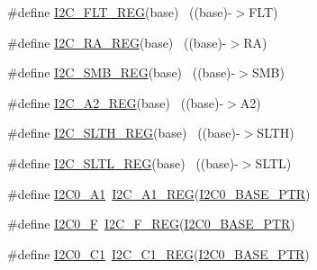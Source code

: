 \begin{DoxyCompactItemize}
\item 
\#define \hyperlink{group___i2_c___register___accessor___macros_gabb230346f2358d18e6f9f126c3ae2398}{I2\+C\+\_\+\+F\+L\+T\+\_\+\+R\+EG}(base)                                            ~((base)-\/$>$F\+LT)
\item 
\#define \hyperlink{group___i2_c___register___accessor___macros_ga9b674394721710e98ba9123d38b6fa1a}{I2\+C\+\_\+\+R\+A\+\_\+\+R\+EG}(base)                                              ~((base)-\/$>$RA)
\item 
\#define \hyperlink{group___i2_c___register___accessor___macros_ga62f6225106137462aab11955b8264f81}{I2\+C\+\_\+\+S\+M\+B\+\_\+\+R\+EG}(base)                                            ~((base)-\/$>$S\+MB)
\item 
\#define \hyperlink{group___i2_c___register___accessor___macros_ga01c9da9747989c2d30eac15661d1f5c3}{I2\+C\+\_\+\+A2\+\_\+\+R\+EG}(base)                                              ~((base)-\/$>$A2)
\item 
\#define \hyperlink{group___i2_c___register___accessor___macros_gac1a6a43a0292446673c0d1d39cd69e21}{I2\+C\+\_\+\+S\+L\+T\+H\+\_\+\+R\+EG}(base)                                          ~((base)-\/$>$S\+L\+TH)
\item 
\#define \hyperlink{group___i2_c___register___accessor___macros_gaa9eb90e621e77e8758f4c7f6724b9011}{I2\+C\+\_\+\+S\+L\+T\+L\+\_\+\+R\+EG}(base)                                          ~((base)-\/$>$S\+L\+TL)
\item 
\#define \hyperlink{group___i2_c___register___accessor___macros_gaab25b2cfc0f440c11ba84defee435e0e}{I2\+C0\+\_\+\+A1}~\hyperlink{group___i2_c___register___accessor___macros_gaf3e90bf855e545f82942bfb9207756a6}{I2\+C\+\_\+\+A1\+\_\+\+R\+EG}(\hyperlink{group___i2_c___peripheral_ga6db92fda81fa3b6a1c8c6a85e66d51a0}{I2\+C0\+\_\+\+B\+A\+S\+E\+\_\+\+P\+TR})
\item 
\#define \hyperlink{group___i2_c___register___accessor___macros_gacd455dbff54b6e42523e833319e562e4}{I2\+C0\+\_\+F}~\hyperlink{group___i2_c___register___accessor___macros_ga7aae8ba32e5e505c2db1bbc3b7c20213}{I2\+C\+\_\+\+F\+\_\+\+R\+EG}(\hyperlink{group___i2_c___peripheral_ga6db92fda81fa3b6a1c8c6a85e66d51a0}{I2\+C0\+\_\+\+B\+A\+S\+E\+\_\+\+P\+TR})
\item 
\#define \hyperlink{group___i2_c___register___accessor___macros_gad710afb8dd19706b83bc65c3f460e81d}{I2\+C0\+\_\+\+C1}~\hyperlink{group___i2_c___register___accessor___macros_ga339b4af5c87abf62ac1689a412de6253}{I2\+C\+\_\+\+C1\+\_\+\+R\+EG}(\hyperlink{group___i2_c___peripheral_ga6db92fda81fa3b6a1c8c6a85e66d51a0}{I2\+C0\+\_\+\+B\+A\+S\+E\+\_\+\+P\+TR})

\end{DoxyCompactItemize}
